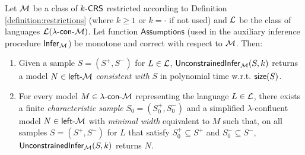 \begin{theorem}\label{theorem:unconstrained-lambda-inference}
Let $\textup{\sf $\mathcal{M}$}$ be a class of $\textup{\sf $k$-\textup{\sf CRS\/}}$ restricted according to Definition \ref{definition:restrictions} (where $k \ge 1$ or $k = \cdot$ if not used) and $\textup{\sf $\mathcal{L}$}$ be the class of languages ${\cal L}(\textup{\sf $\lambda$-con-\textup{\sf $\mathcal{M}$}})$. Let function $\mathsf{Assumptions}$ (used in the auxiliary inference procedure $\mathsf{Infer}_{\textup{\sf $\mathcal{M}$}}$) be monotone and correct with respect to $\textup{\sf $\mathcal{M}$}$. Then:
\begin{enumerate}
\item\label{unconstrained-lambda-inference1} Given a sample $S = (S^+, S^-)$ for $L \in \textup{\sf $\mathcal{L}$}$, $\mathsf{UnconstrainedInfer}_{\textup{\sf $\mathcal{M}$}}(S, k)$ returns a model $N \in \textup{\sf left-\textup{\sf $\mathcal{M}$}}$ \emph{consistent with} $S$ in polynomial time w.r.t. $\textup{\sf size}(S)$.

\item\label{unconstrained-lambda-inference2} For every model $M \in \textup{\sf $\lambda$-con-\textup{\sf $\mathcal{M}$}}$ representing the language $L \in \textup{\sf $\mathcal{L}$}$, there exists a finite \emph{characteristic sample} $S_0 = (S_0^+, S_0^-)$ and a simplified $\lambda$-confluent model $N \in \textup{\sf left-\textup{\sf $\mathcal{M}$}}$ with \emph{minimal width} equivalent to $M$ such that, on all samples $S = (S^+, S^-)$ for $L$ that satisfy $S_0^+ \subseteq S^+$ and $S_0^- \subseteq S^-$, $\mathsf{UnconstrainedInfer}_{\textup{\sf $\mathcal{M}$}}(S, k)$ returns $N$.
\end{enumerate}
\end{theorem}

